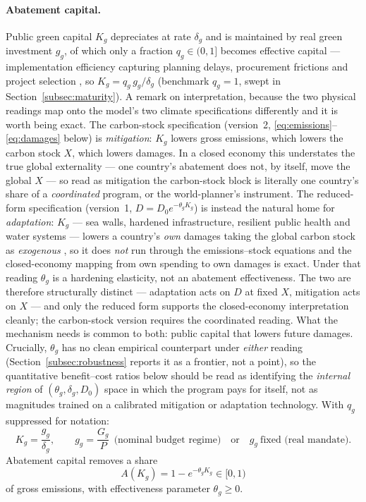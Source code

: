 \documentclass[12pt]{article}
\begin{document}
\paragraph{Abatement capital.} Public green capital $K_g$ depreciates at rate
$\delta_g$ and is maintained by real green investment $g_g$, of which only a
fraction $q_g \in (0,1]$ becomes effective capital --- implementation
efficiency capturing planning delays, procurement frictions and project
selection \citep[in the spirit of][and the IMF's Climate-PIMA
framework]{leeperwalkeryang2010}, so $K_g = q_g\, g_g/\delta_g$ (benchmark
$q_g = 1$, swept in Section~\ref{subsec:maturity}). A remark on
interpretation, because the two physical readings map onto the model's two
climate specifications differently and it is worth being exact. The
carbon-stock specification (version~2, \eqref{eq:emissions}--\eqref{eq:damages}
below) is \emph{mitigation}: $K_g$ lowers gross emissions, which lowers the
carbon stock $X$, which lowers damages. In a closed economy this understates
the true global externality --- one country's abatement does not, by itself,
move the global $X$ --- so read as mitigation the carbon-stock block is
literally one country's share of a \emph{coordinated} program, or the
world-planner's instrument. The reduced-form specification (version~1,
$D=D_0e^{-\theta_g K_g}$) is instead the natural home for \emph{adaptation}:
$K_g$ --- sea walls, hardened infrastructure, resilient public health and water
systems --- lowers a country's \emph{own} damages taking the global carbon
stock as \emph{exogenous} \citep{fried2022seawalls,konradtweder2023}, so it does
\emph{not} run through the emissions--stock equations and the closed-economy
mapping from own spending to own damages is exact. Under that reading
$\theta_g$ is a hardening elasticity, not an abatement effectiveness. The two
are therefore structurally distinct --- adaptation acts on $D$ at fixed $X$,
mitigation acts on $X$ --- and only the reduced form supports the closed-economy
interpretation cleanly; the carbon-stock version requires the coordinated
reading. What the mechanism needs is common to both: public capital that lowers
future damages. Crucially, $\theta_g$ has no clean empirical counterpart under
\emph{either} reading (Section~\ref{subsec:robustness} reports it as a frontier,
not a point), so the quantitative benefit--cost ratios below should be read as
identifying the \emph{internal region} of $(\theta_g,\delta_g,D_0)$ space in
which the program pays for itself, not as magnitudes trained on a calibrated
mitigation or adaptation technology. With $q_g$ suppressed
for notation:
\begin{equation}
K_g = \frac{g_g}{\delta_g}, \qquad g_g = \frac{G_g}{P}
\ \ \text{(nominal budget regime)} \quad\text{or}\quad g_g\ \text{fixed
(real mandate)}.
\label{eq:Kg}
\end{equation}
Abatement capital removes a share
\begin{equation}
A(K_g) = 1 - e^{-\theta_g K_g}\in[0,1)
\label{eq:abatement}
\end{equation}
of gross emissions, with effectiveness parameter $\theta_g\ge0$.
\end{document}
